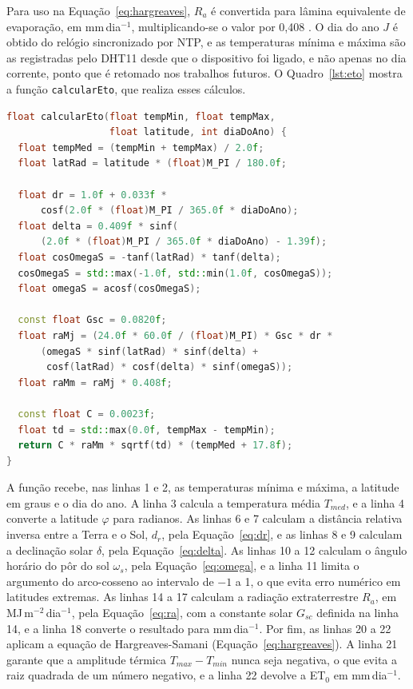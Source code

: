 Para uso na Equação~\ref{eq:hargreaves}, $R_a$ é convertida para lâmina equivalente de evaporação, em mm\,dia$^{-1}$, multiplicando-se o valor por 0,408 \cite{allen1998}. O dia do ano $J$ é obtido do relógio sincronizado por NTP, e as temperaturas mínima e máxima são as registradas pelo DHT11 desde que o dispositivo foi ligado, e não apenas no dia corrente, ponto que é retomado nos trabalhos futuros. O Quadro~\ref{lst:eto} mostra a função \texttt{calcularEto}, que realiza esses cálculos.

\vspace{0.6\baselineskip}
\noindent\begin{minipage}{\linewidth}
\begin{lstlisting}[language=C++, caption={Cálculo da ET$_0$ pela equação de Hargreaves-Samani no firmware (função calcularEto)}, label={lst:eto}]
float calcularEto(float tempMin, float tempMax,
                  float latitude, int diaDoAno) {
  float tempMed = (tempMin + tempMax) / 2.0f;
  float latRad = latitude * (float)M_PI / 180.0f;

  float dr = 1.0f + 0.033f *
      cosf(2.0f * (float)M_PI / 365.0f * diaDoAno);
  float delta = 0.409f * sinf(
      (2.0f * (float)M_PI / 365.0f * diaDoAno) - 1.39f);
  float cosOmegaS = -tanf(latRad) * tanf(delta);
  cosOmegaS = std::max(-1.0f, std::min(1.0f, cosOmegaS));
  float omegaS = acosf(cosOmegaS);

  const float Gsc = 0.0820f;
  float raMj = (24.0f * 60.0f / (float)M_PI) * Gsc * dr *
      (omegaS * sinf(latRad) * sinf(delta) +
       cosf(latRad) * cosf(delta) * sinf(omegaS));
  float raMm = raMj * 0.408f;

  const float C = 0.0023f;
  float td = std::max(0.0f, tempMax - tempMin);
  return C * raMm * sqrtf(td) * (tempMed + 17.8f);
}
\end{lstlisting}
\vspace{-0.5\baselineskip}
\end{minipage}
\medskip

A função recebe, nas linhas 1 e 2, as temperaturas mínima e máxima, a latitude em graus e o dia do ano. A linha 3 calcula a temperatura média $T_{med}$, e a linha 4 converte a latitude $\varphi$ para radianos. As linhas 6 e 7 calculam a distância relativa inversa entre a Terra e o Sol, $d_r$, pela Equação~\ref{eq:dr}, e as linhas 8 e 9 calculam a declinação solar $\delta$, pela Equação~\ref{eq:delta}. As linhas 10 a 12 calculam o ângulo horário do pôr do sol $\omega_s$, pela Equação~\ref{eq:omega}, e a linha 11 limita o argumento do arco-cosseno ao intervalo de $-1$ a 1, o que evita erro numérico em latitudes extremas. As linhas 14 a 17 calculam a radiação extraterrestre $R_a$, em MJ\,m$^{-2}$\,dia$^{-1}$, pela Equação~\ref{eq:ra}, com a constante solar $G_{sc}$ definida na linha 14, e a linha 18 converte o resultado para mm\,dia$^{-1}$. Por fim, as linhas 20 a 22 aplicam a equação de Hargreaves-Samani (Equação~\ref{eq:hargreaves}). A linha 21 garante que a amplitude térmica $T_{max} - T_{min}$ nunca seja negativa, o que evita a raiz quadrada de um número negativo, e a linha 22 devolve a ET$_0$ em mm\,dia$^{-1}$.


